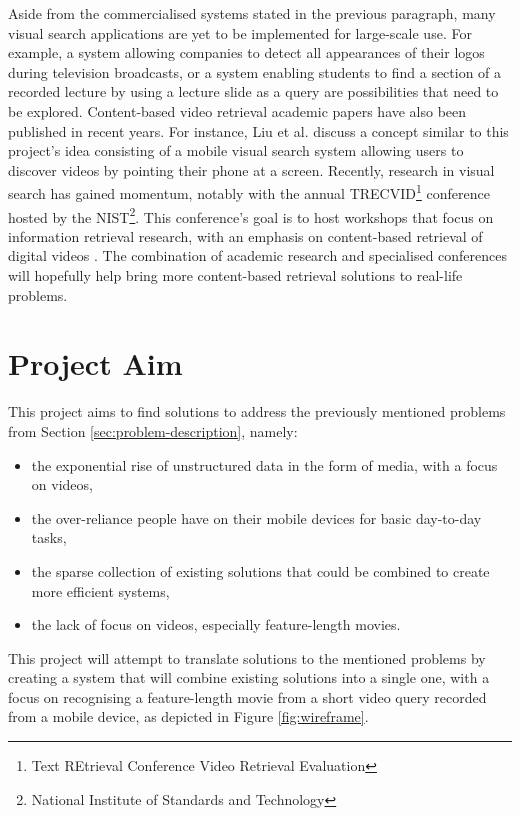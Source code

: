 Aside from the commercialised systems stated in the previous paragraph, many visual search applications are yet to be implemented for large-scale use. For example, a system allowing companies to detect all appearances of their logos during television broadcasts, or a system enabling students to find a section of a recorded lecture by using a lecture slide as a query \cite{araujo2017i2v} are possibilities that need to be explored. Content-based video retrieval academic papers have also been published in recent years. For instance, Liu et al. \cite{liu2014mobilevideosearch} discuss a concept similar to this project's idea consisting of a mobile visual search system allowing users to discover videos by pointing their phone at a screen. Recently, research in visual search has gained momentum, notably with the annual TRECVID\footnote{Text REtrieval Conference Video Retrieval Evaluation} conference \cite{2018trecvidawad} hosted by the NIST\footnote{National Institute of Standards and Technology}. This conference's goal is to host workshops that focus on information retrieval research, with an emphasis on content-based retrieval of digital videos \cite{trecvid-general}. The combination of academic research and specialised conferences will hopefully help bring more content-based retrieval solutions to real-life problems.

\section{Project Aim}

This project aims to find solutions to address the previously mentioned problems from Section \ref{sec:problem-description}, namely:

\begin{itemize}
    \item the exponential rise of unstructured data in the form of media, with a focus on videos,
    \item the over-reliance people have on their mobile devices for basic day-to-day tasks,
    \item the sparse collection of existing solutions that could be combined to create more efficient systems,
    \item the lack of focus on videos, especially feature-length movies.
\end{itemize}

This project will attempt to translate solutions to the mentioned problems by creating a system that will combine existing solutions into a single one, with a focus on recognising a feature-length movie from a short video query recorded from a mobile device, as depicted in Figure \ref{fig:wireframe}.

